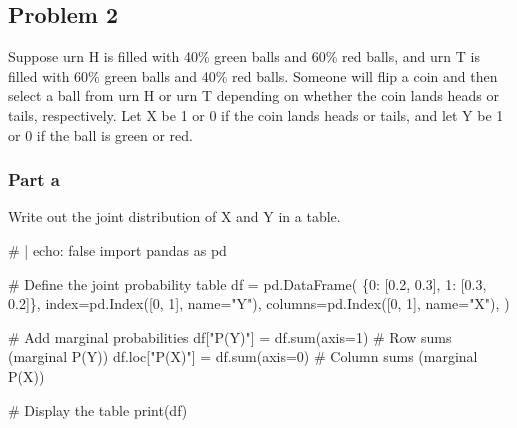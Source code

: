 \documentclass[
  letterpaper,
  DIV=11,
  numbers=noendperiod]{scrartcl}
\newenvironment{Shaded}{\begin{snugshade}}{\end{snugshade}}
\newcommand{\BuiltInTok}[1]{\textcolor[rgb]{0.00,0.23,0.31}{#1}}
\newcommand{\CommentTok}[1]{\textcolor[rgb]{0.37,0.37,0.37}{#1}}
\newcommand{\DecValTok}[1]{\textcolor[rgb]{0.68,0.00,0.00}{#1}}
\newcommand{\FloatTok}[1]{\textcolor[rgb]{0.68,0.00,0.00}{#1}}
\newcommand{\ImportTok}[1]{\textcolor[rgb]{0.00,0.46,0.62}{#1}}
\newcommand{\NormalTok}[1]{\textcolor[rgb]{0.00,0.23,0.31}{#1}}
\newcommand{\OperatorTok}[1]{\textcolor[rgb]{0.37,0.37,0.37}{#1}}
\newcommand{\StringTok}[1]{\textcolor[rgb]{0.13,0.47,0.30}{#1}}
\begin{document}
\subsection{Problem 2}\label{problem-2}

Suppose urn H is filled with 40\% green balls and 60\% red balls, and
urn T is filled with 60\% green balls and 40\% red balls. Someone will
flip a coin and then select a ball from urn H or urn T depending on
whether the coin lands heads or tails, respectively. Let X be 1 or 0 if
the coin lands heads or tails, and let Y be 1 or 0 if the ball is green
or red.

\subsubsection{Part a}\label{part-a}

Write out the joint distribution of X and Y in a table.

\begin{Shaded}
\begin{Highlighting}[]
\CommentTok{\# | echo: false}
\ImportTok{import}\NormalTok{ pandas }\ImportTok{as}\NormalTok{ pd}

\CommentTok{\# Define the joint probability table}
\NormalTok{df }\OperatorTok{=}\NormalTok{ pd.DataFrame(}
\NormalTok{    \{}\DecValTok{0}\NormalTok{: [}\FloatTok{0.2}\NormalTok{, }\FloatTok{0.3}\NormalTok{], }\DecValTok{1}\NormalTok{: [}\FloatTok{0.3}\NormalTok{, }\FloatTok{0.2}\NormalTok{]\},}
\NormalTok{    index}\OperatorTok{=}\NormalTok{pd.Index([}\DecValTok{0}\NormalTok{, }\DecValTok{1}\NormalTok{], name}\OperatorTok{=}\StringTok{"Y"}\NormalTok{),}
\NormalTok{    columns}\OperatorTok{=}\NormalTok{pd.Index([}\DecValTok{0}\NormalTok{, }\DecValTok{1}\NormalTok{], name}\OperatorTok{=}\StringTok{"X"}\NormalTok{),}
\NormalTok{)}

\CommentTok{\# Add marginal probabilities}
\NormalTok{df[}\StringTok{"P(Y)"}\NormalTok{] }\OperatorTok{=}\NormalTok{ df.}\BuiltInTok{sum}\NormalTok{(axis}\OperatorTok{=}\DecValTok{1}\NormalTok{)  }\CommentTok{\# Row sums (marginal P(Y))}
\NormalTok{df.loc[}\StringTok{"P(X)"}\NormalTok{] }\OperatorTok{=}\NormalTok{ df.}\BuiltInTok{sum}\NormalTok{(axis}\OperatorTok{=}\DecValTok{0}\NormalTok{)  }\CommentTok{\# Column sums (marginal P(X))}

\CommentTok{\# Display the table}
\BuiltInTok{print}\NormalTok{(df)}
\end{Highlighting}
\end{Shaded}
\end{document}
